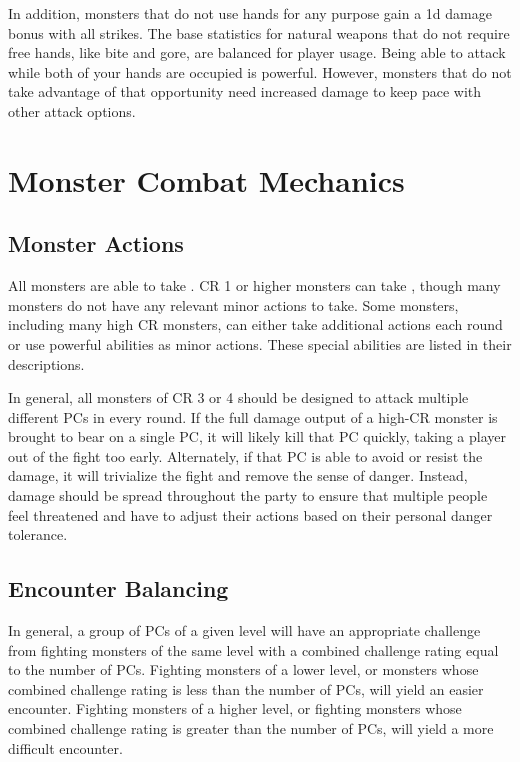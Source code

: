         In addition, monsters that do not use hands for any purpose gain a \plus1d damage bonus with all strikes.
        The base statistics for natural weapons that do not require free hands, like bite and gore, are balanced for player usage.
        Being able to attack while both of your hands are occupied is powerful.
        However, monsters that do not take advantage of that opportunity need increased damage to keep pace with other attack options.

\section{Monster Combat Mechanics}

    \subsection{Monster Actions}
        All monsters are able to take .
        CR 1 or higher monsters can take , though many monsters do not have any relevant minor actions to take.
        Some monsters, including many high CR monsters, can either take additional actions each round or use powerful abilities as minor actions.
        These special abilities are listed in their descriptions.

        In general, all monsters of CR 3 or 4 should be designed to attack multiple different PCs in every round.
        If the full damage output of a high-CR monster is brought to bear on a single PC, it will likely kill that PC quickly, taking a player out of the fight too early.
        Alternately, if that PC is able to avoid or resist the damage, it will trivialize the fight and remove the sense of danger.
        Instead, damage should be spread throughout the party to ensure that multiple people feel threatened and have to adjust their actions based on their personal danger tolerance.

    \subsection{Encounter Balancing}\label{Encounter Balancing}
        In general, a group of PCs of a given level will have an appropriate challenge from fighting monsters of the same level with a combined challenge rating equal to the number of PCs.
        Fighting monsters of a lower level, or monsters whose combined challenge rating is less than the number of PCs, will yield an easier encounter.
        Fighting monsters of a higher level, or fighting monsters whose combined challenge rating is greater than the number of PCs, will yield a more difficult encounter.


